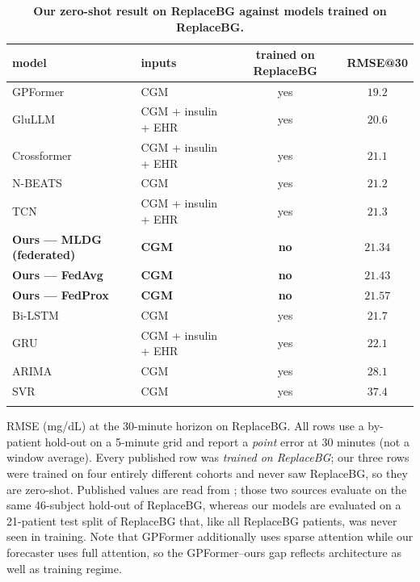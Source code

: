 \documentclass[10pt,letterpaper]{article}
\newlength\savedwidth
\newcommand\thickhline{\noalign{\global\savedwidth\arrayrulewidth\global\arrayrulewidth 2pt}%
\hline
\noalign{\global\arrayrulewidth\savedwidth}}
\begin{document}
\begin{table}[!ht]
\centering
\captionsetup{justification=centering,singlelinecheck=on}
\caption{\bf Our zero-shot result on ReplaceBG against models trained on ReplaceBG.}
\label{tab:oodprior}
\begin{tabular}{llcc}
\thickhline
model & inputs & trained on ReplaceBG & RMSE@30 \\
\hline
GPFormer \cite{zhu2024gpformer}    & CGM                & yes & $19.2$ \\
GluLLM \cite{zhu2026glullm}        & CGM + insulin + EHR & yes & $20.6$ \\
Crossformer \cite{zhu2026glullm}   & CGM + insulin + EHR & yes & $21.1$ \\
N-BEATS \cite{zhu2024gpformer}     & CGM                & yes & $21.2$ \\
TCN \cite{zhu2026glullm}           & CGM + insulin + EHR & yes & $21.3$ \\
\textbf{Ours --- MLDG (federated)} & \textbf{CGM}       & \textbf{no} & $\mathbf{21.34}$ \\
\textbf{Ours --- FedAvg}           & \textbf{CGM}       & \textbf{no} & $\mathbf{21.43}$ \\
\textbf{Ours --- FedProx}          & \textbf{CGM}       & \textbf{no} & $\mathbf{21.57}$ \\
Bi-LSTM \cite{zhu2024gpformer}     & CGM                & yes & $21.7$ \\
GRU \cite{zhu2026glullm}           & CGM + insulin + EHR & yes & $22.1$ \\
ARIMA \cite{zhu2024gpformer}       & CGM                & yes & $28.1$ \\
SVR \cite{zhu2024gpformer}         & CGM                & yes & $37.4$ \\
\thickhline
\end{tabular}
\begin{center}
{\small RMSE (mg/dL) at the 30-minute horizon on ReplaceBG. All rows use a
by-patient hold-out on a 5-minute grid and report a \emph{point} error at 30
minutes (not a window average). Every published row was \emph{trained on
ReplaceBG}; our three rows were trained on four entirely different cohorts and
never saw ReplaceBG, so they are zero-shot. Published values are read from
\cite{zhu2024gpformer,zhu2026glullm}; those two sources evaluate on the same
46-subject hold-out of ReplaceBG, whereas our models are evaluated on a 21-patient
test split of ReplaceBG that, like all ReplaceBG patients, was never seen in
training. Note that GPFormer additionally uses sparse attention while our
forecaster uses full attention, so the GPFormer--ours gap reflects architecture as
well as training regime.}
\end{center}
\end{table}
\end{document}
